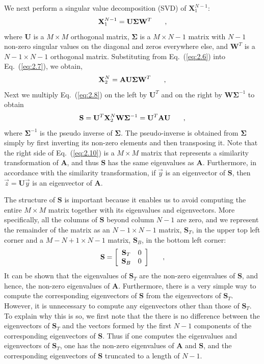 \documentclass[12pt]{article}
\newcommand{\bracket}[1]{\left[ #1 \right]}
\renewcommand{\vec}[1]{\overrightarrow{#1}}
\newcommand{\be}{\begin{equation}}
\newcommand{\ee}{\end{equation}}
\newcommand{\pec}{\hspace{0.25in},}
\newcommand{\LEQ}[1]{\label{eq:#1}}
\newcommand{\EQ}[1]{Eq.~(\ref{eq:#1})}
\newcommand{\mA}{\mathbf{A}}
\newcommand{\mX}{\mathbf{X}}
\newcommand{\mU}{\mathbf{U}}
\newcommand{\mW}{\mathbf{W}}
\newcommand{\mSigma}{\mathbf{\Sigma}}
\newcommand{\mS}{\mathbf{S}}
\begin{document}
We next perform a singular value decomposition (SVD) of $\mX_{1}^{N-1}$:
\be
\mX_{1}^{N-1} = \mU \mSigma \mW^T \pec
\LEQ{2.7}
\ee
where $\mU$ is a $M \times M$ orthogonal matrix, $\mSigma$ is a $M\times N-1$ matrix with $N-1$ non-zero singular values on 
the diagonal and zeros everywhere else, and $\mW^T$ is a 
$N-1 \times N-1$ orthogonal matrix.  Substituting from \EQ{2.6} into \EQ{2.7}, we obtain, 
\be
\mX_2^{N} = \mA \mU \mSigma \mW^T \pec
\LEQ{2.8}
\ee
Next we multiply \EQ{2.8} on the left by $\mU^{T}$ 
and on the right by $\mW\mSigma^{-1}$ to obtain 
\be
\mS = \mU^{T}\mX_2^{N}\mW\mSigma^{-1} = \mU^{T}\mA\mU \pec
\LEQ{2.10}
\ee
where $\mSigma^{-1}$ is the pseudo inverse of $\mSigma$.  
The pseudo-inverse is obtained from $\mSigma$ simply by first inverting its non-zero elements and then transposing it. 
Note that the right side of \EQ{2.10} is a $M \times M$ matrix that represents a similarity transformation 
of $\mA$, and thus $\mS$ has the same eigenvalues as $\mA$.  Furthermore, in accordance with the similarity transformation, 
if $\vec{y}$ is an eigenvector of $\mS$, then $\vec{z} = \mU \vec{y}$ is an eigenvector of $\mA$.  

The structure of $\mS$ is important because it enables us to avoid computing the entire $M \times M$ matrix together with 
its eigenvalues and eigenvectors.  More specifically, all the columns of $\mS$ beyond column $N-1$ are zero, and 
we represent the remainder of the matrix as an $N-1 \times N-1$ matrix, $\mS_{T}$, in the upper top left corner and 
a $M-N+1 \times N-1$ matrix, $\mS_B$, in the bottom left corner:
\be
\mS = \bracket{
\begin{array}{cc}
\mS_T  & 0 \\
\mS_B & 0  
\end{array}
} \pec
\LEQ{2.11}
\ee
It can be shown that the eigenvalues of $\mS_T$ are the non-zero eigenvalues of $\mS$, and hence, the non-zero eigenvalues of 
$\mA$.  Furthermore, there is a very simple way to compute the corresponding eigenvectors of $\mS$ from the eigenvectors of 
$\mS_T$. However, it is unnecessary to compute any eigenvectors other than those of $\mS_T$.  To explain why this is so, we 
first note that the there is no difference between the eigenvectors of $\mS_T$ and the vectors formed by the first $N-1$ 
components of the corresponding eigenvectors of $\mS$.  Thus if one computes the eigenvalues and eigenvectors of $\mS_T$, 
one has the non-zero eigenvalues of $\mA$ and $\mS$, and the corresponding eigenvectors of $\mS$ truncated to a length of $N-1$.
\end{document}
